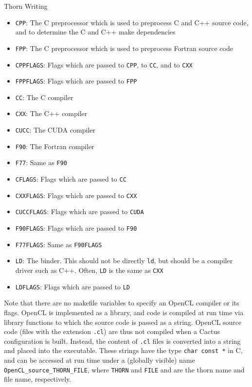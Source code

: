 \begin{cactuspart}{Thorn Writing}
\begin{itemize}
\item \texttt{CPP}: The C preprocessor which is used to preprocess C
  and C++ source code, and to determine the C and C++ make
  dependencies
\item \texttt{FPP}: The C preprocessor which is used to preprocess
  Fortran source code
\item \texttt{CPPFLAGS}: Flags which are passed to \texttt{CPP}, to
  \texttt{CC}, and to \texttt{CXX}
\item \texttt{FPPFLAGS}: Flags which are passed to \texttt{FPP}
\item \texttt{CC}: The C compiler
\item \texttt{CXX}: The C++ compiler
\item \texttt{CUCC}: The CUDA compiler
\item \texttt{F90}: The Fortran compiler
\item \texttt{F77}: Same as \texttt{F90}
\item \texttt{CFLAGS}: Flags which are passed to \texttt{CC}
\item \texttt{CXXFLAGS}: Flags which are passed to \texttt{CXX}
\item \texttt{CUCCFLAGS}: Flags which are passed to \texttt{CUDA}
\item \texttt{F90FLAGS}: Flags which are passed to \texttt{F90}
\item \texttt{F77FLAGS}: Same as \texttt{F90FLAGS}
\item \texttt{LD}: The binder.  This should not be directly
  \texttt{ld}, but should be a compiler driver such as C++.
  Often, \texttt{LD} is the same as \texttt{CXX}
\item \texttt{LDFLAGS}: Flags which are passed to \texttt{LD}
\end{itemize}

Note that there are no makefile variables to specify an OpenCL
compiler or its flags. OpenCL is implemented as a library, and code is
compiled at run time via library functions to which the source code is
passed as a string. OpenCL source code (files with the extension
\texttt{.cl}) are thus not compiled when a Cactus configuration is
built. Instead, the content of \texttt{.cl} files is converted into a
string and placed into the executable. These strings have the type
\texttt{char~const~*} in C, and can be accessed at run time under a
(globally visible) name \texttt{OpenCL\_source\_THORN\_FILE}, where
\texttt{THORN} and \texttt{FILE} and are the thorn name and file name,
respectively.


\end{cactuspart}
